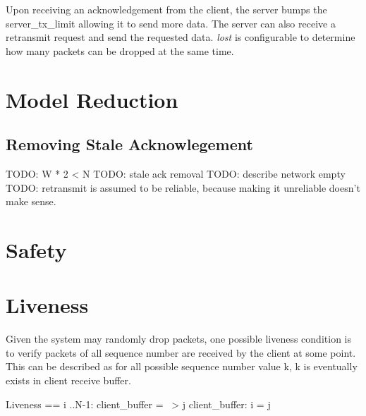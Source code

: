 Upon receiving an acknowledgement from the client, the server bumps the
server\_tx\_limit allowing it to send more data. The server can also receive a 
retransmit request and send the requested data. \textit{lost} is configurable to
determine how many packets can be dropped at the same time.

\section{Model Reduction}

\subsection{Removing Stale Acknowlegement}

TODO: W * 2 < N
TODO: stale ack removal
TODO: describe network empty 
TODO: retransmit is assumed to be reliable, because making it unreliable doesn't make sense.

\section{Safety}

\section{Liveness}

Given the system may randomly drop packets, one possible liveness condition is
to verify packets of all sequence number are received by the client at some
point. This can be described as for all possible sequence number value k, k is
eventually exists in client receive buffer.\newline

\begin{tla}
Liveness == 
    \A i ..N-1:
        client_buffer = {} ~> \E j \in client_buffer: i = j 
\end{tla}
\begin{tlatex}
%
%
\end{tlatex}
\newline






% 
